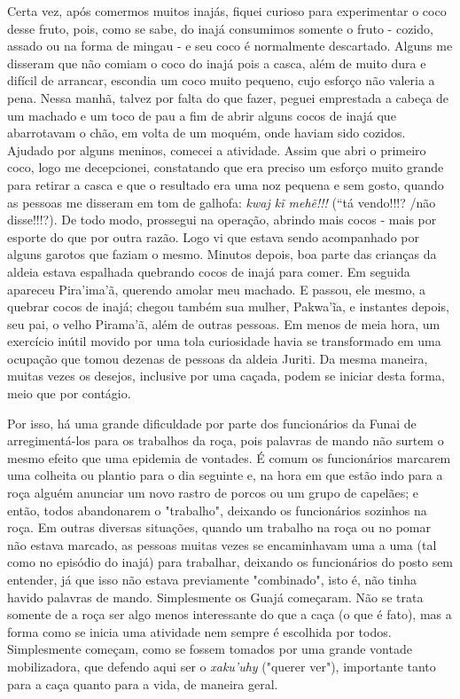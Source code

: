 Certa vez, após comermos muitos inajás, fiquei curioso para experimentar
o coco desse fruto, pois, como se sabe, do inajá consumimos somente o
fruto - cozido, assado ou na forma de mingau - e seu coco é normalmente
descartado. Alguns me disseram que não comiam o coco do inajá pois a
casca, além de muito dura e difícil de arrancar, escondia um coco muito
pequeno, cujo esforço não valeria a pena. Nessa manhã, talvez por falta
do que fazer, peguei emprestada a cabeça de um machado e um toco de pau
a fim de abrir alguns cocos de inajá que abarrotavam o chão, em volta de
um moquém, onde haviam sido cozidos. Ajudado por alguns meninos, comecei
a atividade. Assim que abri o primeiro coco, logo me decepcionei,
constatando que era preciso um esforço muito grande para retirar a casca
e que o resultado era uma noz pequena e sem gosto, quando as pessoas me
disseram em tom de galhofa: \emph{kwaj kĩ mehẽ!!!} (``tá vendo!!!? /não
disse!!!?). De todo modo, prossegui na operação, abrindo mais cocos -
mais por esporte do que por outra razão. Logo vi que estava sendo
acompanhado por alguns garotos que faziam o mesmo. Minutos depois, boa
parte das crianças da aldeia estava espalhada quebrando cocos de inajá
para comer. Em seguida apareceu Pira'ima'ã, querendo amolar meu machado.
E passou, ele mesmo, a quebrar cocos de inajá; chegou também sua mulher,
Pakwa'ĩa, e instantes depois, seu pai, o velho Pirama'ã, além de outras
pessoas. Em menos de meia hora, um exercício inútil movido por uma tola
curiosidade havia se transformado em uma ocupação que tomou dezenas de
pessoas da aldeia Juriti. Da mesma maneira, muitas vezes os desejos,
inclusive por uma caçada, podem se iniciar desta forma, meio que por
contágio.

Por isso, há uma grande dificuldade por parte dos funcionários da Funai
de arregimentá-los para os trabalhos da roça, pois palavras de mando não
surtem o mesmo efeito que uma epidemia de vontades. É comum os
funcionários marcarem uma colheita ou plantio para o dia seguinte e, na
hora em que estão indo para a roça alguém anunciar um novo rastro de
porcos ou um grupo de capelães; e então, todos abandonarem o "trabalho",
deixando os funcionários sozinhos na roça. Em outras diversas situações,
quando um trabalho na roça ou no pomar não estava marcado, as pessoas
muitas vezes se encaminhavam uma a uma (tal como no episódio do inajá)
para trabalhar, deixando os funcionários do posto sem entender, já que
isso não estava previamente "combinado", isto é, não tinha havido
palavras de mando. Simplesmente os Guajá começaram. Não se trata somente
de a roça ser algo menos interessante do que a caça (o que é fato), mas
a forma como se inicia uma atividade nem sempre é escolhida por todos.
Simplesmente começam, como se fossem tomados por uma grande vontade
mobilizadora, que defendo aqui ser o \emph{xaku'uhy} ("querer ver"),
importante tanto para a caça quanto para a vida, de maneira geral.

